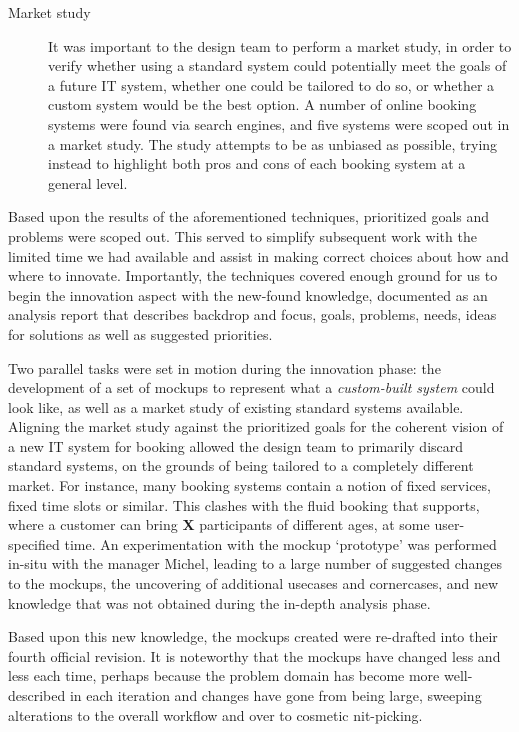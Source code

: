 \begin{description}
    \item [Market study] It was important to the design team to perform a market
        study, in order to verify whether using a standard system could
        potentially meet the goals of a future IT system, whether one could be
        tailored to do so, or whether a custom system would be the best option.
        A number of online booking systems were found via search engines, and
        five systems were scoped out in a market study. The study attempts to be
        as unbiased as possible, trying instead to highlight both pros and cons
        of each booking system at a general level. 
\end{description}

Based upon the results of the aforementioned techniques, prioritized goals and
problems were scoped out. This served to simplify subsequent work with the
limited time we had available and assist in making correct choices about how and
where to innovate. Importantly, the techniques covered enough ground for us to
begin the innovation aspect with the new-found knowledge, documented as an
analysis report\cite[p. 159]{bodker2004participatory} that describes backdrop
and focus, goals, problems, needs, ideas for solutions as well as suggested
priorities.

Two parallel tasks were set in motion during the innovation phase: the
development of a set of mockups to represent what a \textit{custom-built system}
could look like, as well as a market study of existing standard systems
available. Aligning the market study against the prioritized goals for the
coherent vision of a new IT system for booking allowed the design team to
primarily discard standard systems, on the grounds of being tailored to a
completely different market. For instance, many booking systems contain a notion
of fixed services, fixed time slots or similar. This clashes with the fluid
booking that \gomonkey{} supports, where a customer can bring \textbf{X}
participants of different ages, at some user-specified time. An experimentation
with the mockup `prototype' was performed in-situ with the manager Michel, 
leading to a large number of suggested changes to the mockups, the uncovering of
additional usecases and cornercases, and new knowledge that was not obtained
during the in-depth analysis phase.

Based upon this new knowledge, the mockups created were re-drafted into their
fourth official revision. It is noteworthy that the mockups have changed less
and less each time, perhaps because the problem domain has become more
well-described in each iteration and changes have gone from being large,
sweeping alterations to the overall workflow and over to cosmetic nit-picking.

